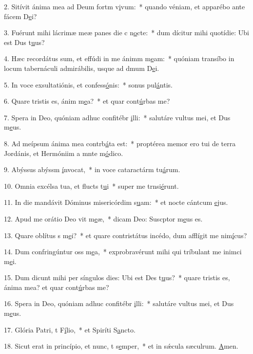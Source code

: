 2. Sitívit ánima mea ad Deum fortm v\uline{i}vum:~* quando véniam, et apparébo ante fácem D\uline{e}i?\par 
3. Fuérunt mihi lácrimæ meæ panes die c n\uline{o}cte:~* dum dícitur mihi quotídie: Ubi est Dus t\uline{u}us?\par 
4. Hæc recordátus sum, et effúdi in me ánimm m\uline{e}am:~* quóniam transíbo in locum tabernáculi admirábilis, usque ad dmum D\uline{e}i.\par 
5. In voce exsultatiónis, et confess\uline{ó}nis:~* sonus pul\uline{á}ntis.\par 
6. Quare tristis es, ánim m\uline{e}a?~* et quar cont\uline{ú}rbas me?\par 
7. Spera in Deo, quóniam adhuc confitébr \uline{i}lli:~* salutáre vultus mei, et Dus m\uline{e}us.\par 
8. Ad meípsum ánima mea contrb\uline{á}ta est:~* proptérea memor ero tui de terra Jordánis, et Hermóniim a mnte m\uline{ó}dico.\par 
9. Abýssus abýssm \uline{í}nvocat,~* in voce cataractárm tu\uline{á}rum.\par 
10. Omnia excélsa tua, et flucts t\uline{u}i~* super me trnsi\uline{é}runt.\par 
11. In die mandávit Dóminus misericórdim s\uline{u}am:~* et nocte cántcum \uline{e}jus.\par 
12. Apud me orátio Deo vit m\uline{e}æ,~* dicam Deo: Suscptor m\uline{e}us es.\par 
13. Quare oblítus s m\uline{e}i?~* et quare contristátus incédo, dum afflígit me nim\uline{í}cus?\par 
14. Dum confringúntur oss m\uline{e}a,~* exprobravérunt mihi qui tríbulant me inimci m\uline{e}i.\par 
15. Dum dicunt mihi per síngulos dies: Ubi est Des t\uline{u}us?~* quare tristis es, ánima mea? et quar cont\uline{ú}rbas me?\par 
16. Spera in Deo, quóniam adhuc confitébr \uline{i}lli:~* salutáre vultus mei, et Dus m\uline{e}us.\par 
17. Glória Patri, t F\uline{í}lio,~* et Spiríti S\uline{a}ncto.\par 
18. Sicut erat in princípio, et nunc, t s\uline{e}mper,~* et in sǽcula sæculrum. \uline{A}men.\par 
